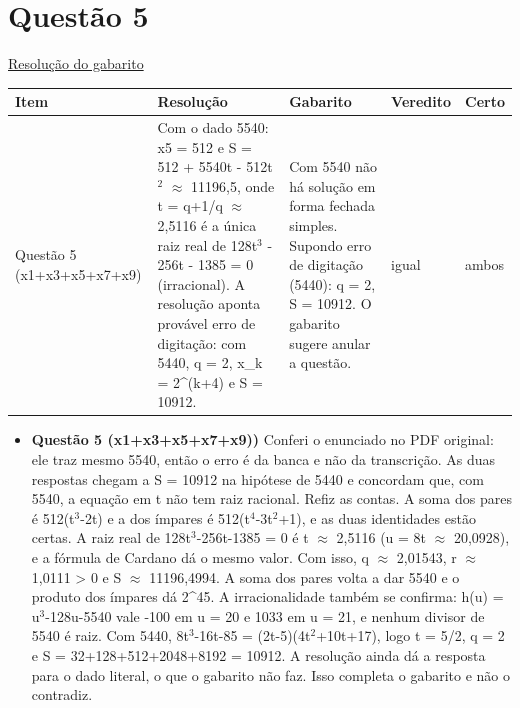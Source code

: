 \documentclass{article}%
\begin{document}
\section*{Questão 5}%
\href{https://poliedroresolve.sistemapoliedro.com.br/vestibulares/ime/2027/ime-2-fase-dia-1-26-10-2026-2-fase-dia-1/dissertativa-5-matematica-2-fase-dia-1-ime-2027}{Resolução do gabarito}\par\smallskip%
\begin{longtable}{@{}p{} p{} p{} p{} p{}@{}}\toprule Item & Resolução & Gabarito & Veredito & Certo \\ \midrule
Questão 5 (x1+x3+x5+x7+x9) & Com o dado 5540: x5 = 512 e S = 512 + 5540t - 512t$^2$ $\approx$ 11196,5, onde t = q+1/q $\approx$ 2,5116 é a única raiz real de 128t$^3$ - 256t - 1385 = 0 (irracional). A resolução aponta provável erro de digitação: com 5440, q = 2, x\_k = 2\^{}(k+4) e S = 10912. & Com 5540 não há solução em forma fechada simples. Supondo erro de digitação (5440): q = 2, S = 10912. O gabarito sugere anular a questão. & igual & ambos \\
\bottomrule\end{longtable}%
\begin{itemize}%
\item%
\textbf{Questão 5 (x1+x3+x5+x7+x9))} Conferi o enunciado no PDF original: ele traz mesmo 5540, então o erro é da banca e não da transcrição. As duas respostas chegam a S = 10912 na hipótese de 5440 e concordam que, com 5540, a equação em t não tem raiz racional. Refiz as contas. A soma dos pares é 512(t$^3$-2t) e a dos ímpares é 512(t$^{4}$-3t$^2$+1), e as duas identidades estão certas. A raiz real de 128t$^3$-256t-1385 = 0 é t $\approx$ 2,5116 (u = 8t $\approx$ 20,0928), e a fórmula de Cardano dá o mesmo valor. Com isso, q $\approx$ 2,01543, r $\approx$ 1,0111 > 0 e S $\approx$ 11196,4994. A soma dos pares volta a dar 5540 e o produto dos ímpares dá 2\^{}45. A irracionalidade também se confirma: h(u) = u$^3$-128u-5540 vale -100 em u = 20 e 1033 em u = 21, e nenhum divisor de 5540 é raiz. Com 5440, 8t$^3$-16t-85 = (2t-5)(4t$^2$+10t+17), logo t = 5/2, q = 2 e S = 32+128+512+2048+8192 = 10912. A resolução ainda dá a resposta para o dado literal, o que o gabarito não faz. Isso completa o gabarito e não o contradiz.%
\end{itemize}%
\end{document}
